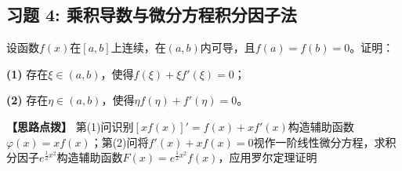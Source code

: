 \documentclass[11pt,a4paper,UTF8]{ctexart}
\begin{document}
\subsection{习题 4: 乘积导数与微分方程积分因子法}

设函数$f(x)$在$[a, b]$上连续，在$(a, b)$内可导，且$f(a) = f(b) = 0$。证明：

\textbf{(1)}  存在$\xi \in (a, b)$，使得$f(\xi) + \xi f'(\xi) = 0$；

\textbf{(2)}  存在$\eta \in (a, b)$，使得$\eta f(\eta) + f'(\eta) = 0$。

\textbf{\color{DeepPurple}【思路点拨】} 第(1)问识别$[xf(x)]' = f(x) + xf'(x)$构造辅助函数$\varphi(x) = xf(x)$；第(2)问将$f'(x) + xf(x) = 0$视作一阶线性微分方程，求积分因子$e^{\frac{1}{2}x^2}$构造辅助函数$F(x) = e^{\frac{1}{2}x^2}f(x)$，应用罗尔定理证明
\end{document}
